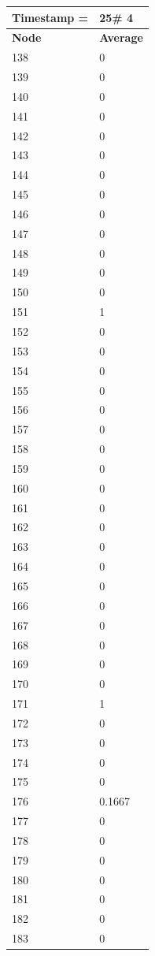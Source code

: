 \begin{tabular}{|l||l|}
\hline
\textbf{Timestamp =} & \textbf{25}\# 4\\\hline
	\textbf{Node} & \textbf{Average} \\ \hline
\hline
	138 & 0 \\ \hline
	139 & 0 \\ \hline
	140 & 0 \\ \hline
	141 & 0 \\ \hline
	142 & 0 \\ \hline
	143 & 0 \\ \hline
	144 & 0 \\ \hline
	145 & 0 \\ \hline
	146 & 0 \\ \hline
	147 & 0 \\ \hline
	148 & 0 \\ \hline
	149 & 0 \\ \hline
	150 & 0 \\ \hline
	151 & 1 \\ \hline
	152 & 0 \\ \hline
	153 & 0 \\ \hline
	154 & 0 \\ \hline
	155 & 0 \\ \hline
	156 & 0 \\ \hline
	157 & 0 \\ \hline
	158 & 0 \\ \hline
	159 & 0 \\ \hline
	160 & 0 \\ \hline
	161 & 0 \\ \hline
	162 & 0 \\ \hline
	163 & 0 \\ \hline
	164 & 0 \\ \hline
	165 & 0 \\ \hline
	166 & 0 \\ \hline
	167 & 0 \\ \hline
	168 & 0 \\ \hline
	169 & 0 \\ \hline
	170 & 0 \\ \hline
	171 & 1 \\ \hline
	172 & 0 \\ \hline
	173 & 0 \\ \hline
	174 & 0 \\ \hline
	175 & 0 \\ \hline
	176 & 0.1667 \\ \hline
	177 & 0 \\ \hline
	178 & 0 \\ \hline
	179 & 0 \\ \hline
	180 & 0 \\ \hline
	181 & 0 \\ \hline
	182 & 0 \\ \hline
	183 & 0 \\ \hline
\end{tabular}
